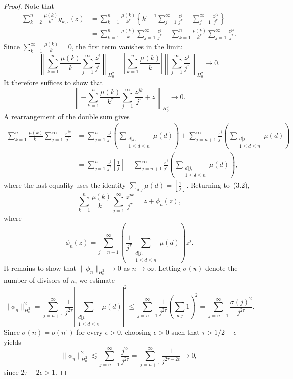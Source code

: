\documentclass[11pt]{extarticle}
\numberwithin{equation}{section}
\theoremstyle{plain}
\theoremstyle{definition}
\begin{document}
\begin{proof}
Note that
\begin{align*}
\sum_{k=2}^{n} \frac{\mu(k)}{k^\tau} g_{k,\tau}(z) 
&= \sum_{k=1}^{n} \frac{\mu(k)}{k^\tau} \left\{ k^{\tau-1}\sum_{j=1}^{\infty} \frac{z^j}{j^\tau} - \sum_{j=1}^{\infty}\frac{z^{jk}}{j^\tau} \right\}\\
&= \sum_{k=1}^{n} \frac{\mu(k)}{k} \sum_{j=1}^{\infty} \frac{z^j}{j^\tau} - \sum_{k=1}^{n} \frac{\mu(k)}{k^\tau} \sum_{j=1}^{\infty}\frac{z^{jk}}{j^\tau}.
\end{align*}
Since $\sum_{k=1}^{\infty} \frac{\mu(k)}{k} = 0$, the first term vanishes in the limit:
\[
\left\|\sum_{k=1}^{n} \frac{\mu(k)}{k} \sum_{j=1}^{\infty} \frac{z^j}{j^\tau}\right\|_{H^2_0} 
= \left|\sum_{k=1}^{n} \frac{\mu(k)}{k}\right| \left\|\sum_{j=1}^{\infty} \frac{z^j}{j^\tau}\right\|_{H^2_0} \longrightarrow 0.
\]
It therefore suffices to show that
\[
\left\| -\sum_{k=1}^{n} \frac{\mu(k)}{k^\tau} \sum_{j=1}^{\infty}\frac{z^{jk}}{j^\tau} + z \right\|_{H^2_0} \longrightarrow 0. \tag{3.1}
\]
A rearrangement of the double sum gives
\begin{align*}
\sum_{k=1}^{n} \frac{\mu(k)}{k^\tau} \sum_{j=1}^{\infty}\frac{z^{jk}}{j^\tau}
&= \sum_{j=1}^{n} \frac{z^j}{j^\tau}\left(\sum_{\substack{d|j,\\ 1\leq d\leq n}}\mu(d)\right) + \sum_{j=n+1}^{\infty} \frac{z^j}{j^\tau}\left(\sum_{\substack{d|j,\\ 1\leq d\leq n}}\mu(d)\right)\\
&= \sum_{j=1}^{n} \frac{z^j}{j^\tau}\left[\frac{1}{j}\right] + \sum_{j=n+1}^{\infty} \frac{z^j}{j^\tau}\left(\sum_{\substack{d|j,\\ 1\leq d\leq n}}\mu(d)\right), \tag{3.2}
\end{align*}
where the last equality uses the identity $\sum_{d|j}\mu(d) = \left[\frac{1}{j}\right]$. Returning to~(3.2),
\[
\sum_{k=1}^{n} \frac{\mu(k)}{k^\tau} \sum_{j=1}^{\infty}\frac{z^{jk}}{j^\tau} = z + \phi_n(z),
\]
where
\[
\phi_n(z) = \sum_{j=n+1}^{\infty} \left(\frac{1}{j^\tau}\sum_{\substack{d|j,\\ 1\leq d\leq n}}\mu(d)\right) z^j.
\]
It remains to show that $\|\phi_n\|_{H^2_0} \to 0$ as $n \to \infty$. 
Letting $\sigma(n)$ denote the number of divisors of $n$, we estimate
\[
\|\phi_n\|^2_{H^2_0} = \sum_{j=n+1}^{\infty} \frac{1}{j^{2\tau}}\left|\sum_{\substack{d|j,\\ 1\leq d\leq n}}\mu(d)\right|^2 
\leq \sum_{j=n+1}^{\infty} \frac{1}{j^{2\tau}}\left(\sum_{d|j}1\right)^2 
= \sum_{j=n+1}^{\infty} \frac{\sigma(j)^2}{j^{2\tau}}.
\]
Since $\sigma(n) = o(n^\epsilon)$ for every $\epsilon > 0$, choosing $\epsilon > 0$ 
such that $\tau > 1/2 + \epsilon$ yields
\[
\|\phi_n\|^2_{H^2_0} \lesssim \sum_{j=n+1}^{\infty} \frac{j^{2\epsilon}}{j^{2\tau}} 
= \sum_{j=n+1}^{\infty} \frac{1}{j^{2\tau - 2\epsilon}} \longrightarrow 0,
\]
since $2\tau - 2\epsilon > 1$.
\end{proof}
\end{document}

